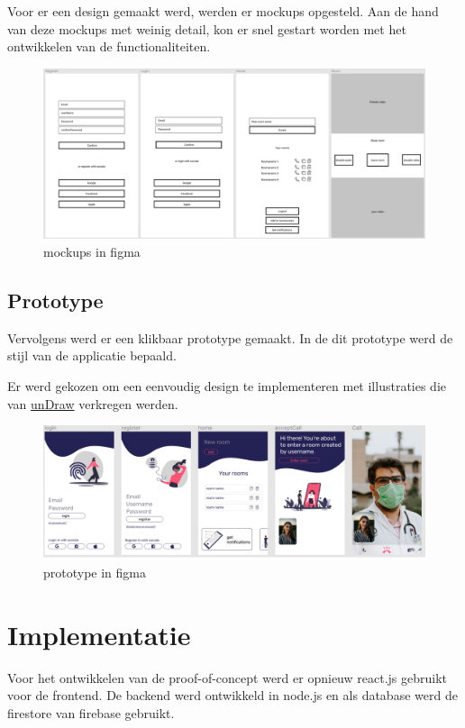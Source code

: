 			Voor er een design gemaakt werd, werden er mockups opgesteld.
			Aan de hand van deze mockups met weinig detail, kon er snel gestart worden met het ontwikkelen van de functionaliteiten. \autocite{Tate2019}
			\begin{figure}[H]
				\centering
				\includegraphics[width=140mm]{./img/mockup-poc.png}{}
				\caption{mockups in figma}
			\end{figure}
		
		
		\subsection{Prototype}
		
			Vervolgens werd er een klikbaar prototype gemaakt. In de dit prototype werd de stijl van de applicatie bepaald.
			
			Er werd gekozen om een eenvoudig design te implementeren met illustraties die van \href{https://undraw.co/}{unDraw} verkregen werden.
			
			\begin{figure}[H]
				\centering
				\includegraphics[width=140mm]{./img/prototype-poc.png}{}
				\caption{prototype in figma}
			\end{figure}
			
	
\section{Implementatie}
	Voor het ontwikkelen van de proof-of-concept werd er opnieuw react.js gebruikt voor de frontend. De backend werd ontwikkeld in node.js en als database werd de firestore van firebase gebruikt.
	
